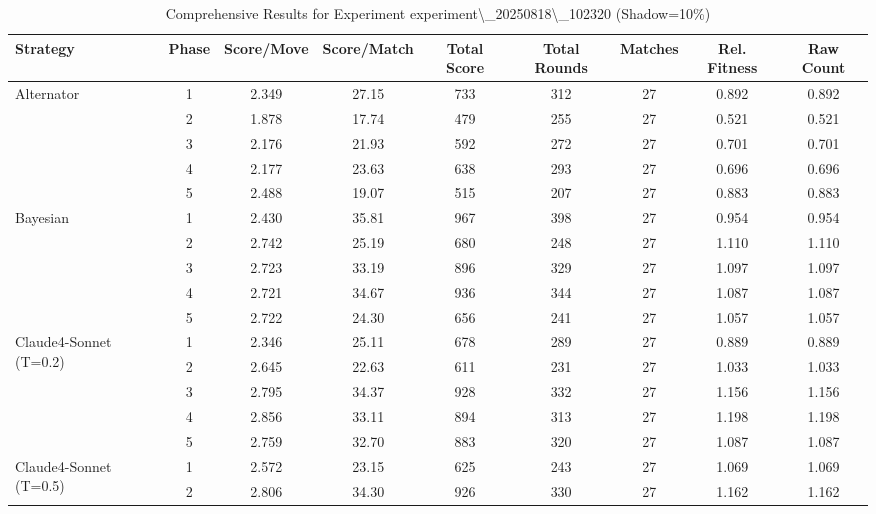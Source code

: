\begin{table}[htbp]
\centering
\scriptsize
\caption{Comprehensive Results for Experiment experiment\textbackslash{}_20250818\textbackslash{}_102320 (Shadow=10\%)}
\label{tab:experiment_20250818_102320_comprehensive}
\begin{adjustbox}{width=\textwidth,center}
\begin{tabular}{|l|c|c|c|c|c|c|c|c|}
\hline
\textbf{Strategy} & \textbf{Phase} & \textbf{Score/Move} & \textbf{Score/Match} & \textbf{Total Score} & \textbf{Total Rounds} & \textbf{Matches} & \textbf{Rel. Fitness} & \textbf{Raw Count} \\
\hline
\multirow{5}{*}{Alternator} & 
1 & 
2.349 & 
27.15 & 
733 & 
312 & 
27 & 
0.892 & 
0.892 \\
 & 
2 & 
1.878 & 
17.74 & 
479 & 
255 & 
27 & 
0.521 & 
0.521 \\
 & 
3 & 
2.176 & 
21.93 & 
592 & 
272 & 
27 & 
0.701 & 
0.701 \\
 & 
4 & 
2.177 & 
23.63 & 
638 & 
293 & 
27 & 
0.696 & 
0.696 \\
 & 
5 & 
2.488 & 
19.07 & 
515 & 
207 & 
27 & 
0.883 & 
0.883 \\
\hline
\multirow{5}{*}{Bayesian} & 
1 & 
2.430 & 
35.81 & 
967 & 
398 & 
27 & 
0.954 & 
0.954 \\
 & 
2 & 
2.742 & 
25.19 & 
680 & 
248 & 
27 & 
1.110 & 
1.110 \\
 & 
3 & 
2.723 & 
33.19 & 
896 & 
329 & 
27 & 
1.097 & 
1.097 \\
 & 
4 & 
2.721 & 
34.67 & 
936 & 
344 & 
27 & 
1.087 & 
1.087 \\
 & 
5 & 
2.722 & 
24.30 & 
656 & 
241 & 
27 & 
1.057 & 
1.057 \\
\hline
\multirow{5}{*}{Claude4-Sonnet (T=0.2)} & 
1 & 
2.346 & 
25.11 & 
678 & 
289 & 
27 & 
0.889 & 
0.889 \\
 & 
2 & 
2.645 & 
22.63 & 
611 & 
231 & 
27 & 
1.033 & 
1.033 \\
 & 
3 & 
2.795 & 
34.37 & 
928 & 
332 & 
27 & 
1.156 & 
1.156 \\
 & 
4 & 
2.856 & 
33.11 & 
894 & 
313 & 
27 & 
1.198 & 
1.198 \\
 & 
5 & 
2.759 & 
32.70 & 
883 & 
320 & 
27 & 
1.087 & 
1.087 \\
\hline
\multirow{5}{*}{Claude4-Sonnet (T=0.5)} & 
1 & 
2.572 & 
23.15 & 
625 & 
243 & 
27 & 
1.069 & 
1.069 \\
 & 
2 & 
2.806 & 
34.30 & 
926 & 
330 & 
27 & 
1.162 & 
1.162 \\

\end{tabular}
\end{adjustbox}
\end{table}
